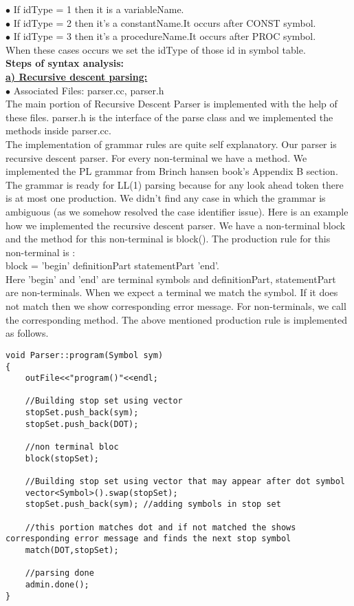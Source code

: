 \documentclass[paper=letter, fontsize=12pt]{scrartcl} %
\begin{document}
$\bullet$ If idType = 1 then it is a variableName.\\ 
$\bullet$ If idType = 2	then it's a constantName.It occurs after CONST symbol.\\
$\bullet$ If idType = 3 then it's a procedureName.It occurs after PROC symbol. \\ 

When these cases occurs we set the idType of those id in symbol table.\\

\pagebreak
{\bf Steps of syntax analysis:}\\

\underline {\bf a) Recursive descent parsing:}\\

$\bullet$ Associated Files: parser.cc, parser.h\\ 

The main portion of Recursive Descent Parser is implemented with the help of these files. parser.h is the interface of the parse class and we implemented the methods inside parser.cc.\\

The implementation of grammar rules are quite self explanatory. Our parser is recursive descent parser. For every non-terminal we have a method. We implemented the PL grammar from Brinch hansen book's Appendix B section. The grammar is ready for LL(1) parsing because for any look ahead token there is at most one production. We didn't find any case in which the grammar is ambiguous (as we somehow resolved the case identifier issue). Here is an example how we implemented the recursive descent parser. We have a non-terminal block and the method for this non-terminal is block(). The production rule for this non-terminal is :\\

block = 'begin' definitionPart statementPart 'end'.\\

Here 'begin' and 'end' are terminal symbols and definitionPart, statementPart are non-terminals. When we expect a terminal we match the symbol. If it does not match then we show corresponding error message. For non-terminals, we call the corresponding method. The above mentioned production rule is implemented as follows.

\begin{lstlisting}
void Parser::program(Symbol sym)
{
	outFile<<"program()"<<endl;
	
	//Building stop set using vector		
	stopSet.push_back(sym);
	stopSet.push_back(DOT);
		
	//non terminal bloc	
	block(stopSet);	
	
	//Building stop set using vector that may appear after dot symbol
	vector<Symbol>().swap(stopSet);
	stopSet.push_back(sym); //adding symbols in stop set
	
	//this portion matches dot and if not matched the shows corresponding error message and finds the next stop symbol
	match(DOT,stopSet);
	
	//parsing done
	admin.done();
}

\end{lstlisting}
\end{document}

